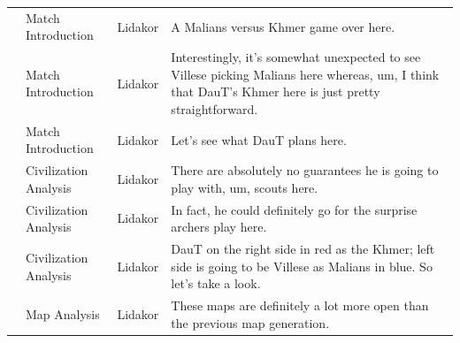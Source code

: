 {\begin{longtable}{@{}>{\theAppRow}r|L{2.3cm}L{1.0cm}U{11.55cm}@{}}
    \bottomrule
    \endlastfoot
    & Match Introduction    & Lidakor & A Malians versus Khmer game over here.                                                                                                                                                                                                                                                          \\
    & Match Introduction    & Lidakor & Interestingly, it's somewhat unexpected to see Villese picking Malians here whereas, um, I think that DauT's Khmer here is just pretty straightforward.                                                                                                                                         \\
    & Match Introduction    & Lidakor & Let's see what DauT plans here.                                                                                                                                                                                                                                                                 \\
    & Civilization Analysis & Lidakor & There are absolutely no guarantees he is going to play with, um, scouts here.                                                                                                                                                                                                                   \\
    & Civilization Analysis & Lidakor & In fact, he could definitely go for the surprise archers play here.                                                                                                                                                                                                                             \\
    & Civilization Analysis & Lidakor & DauT on the right side in red as the Khmer; left side is going to be Villese as Malians in blue. So let's take a look.                                                                                                                                                                          \\
    & Map Analysis          & Lidakor & These maps are definitely a lot more open than the previous map generation.                                                                                                                                                                                                                     \\

\end{longtable}}
